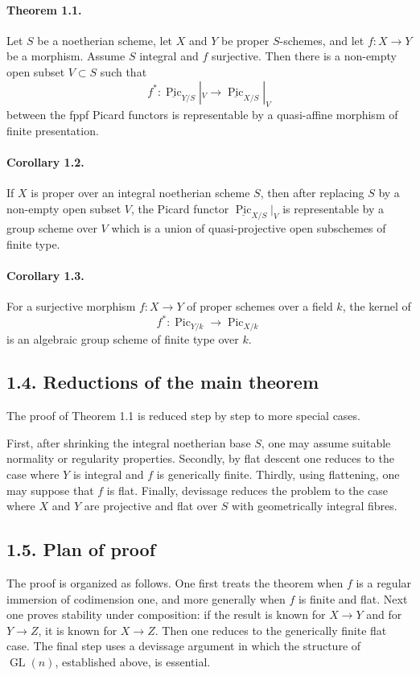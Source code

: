 \documentclass[12pt]{article}
\newcommand{\Pic}{\operatorname{Pic}}
\newcommand{\Gl}{\operatorname{GL}}
\newcommand{\longto}{\longrightarrow}
\begin{document}
\paragraph{Theorem 1.1.}
Let $S$ be a noetherian scheme, let $X$ and $Y$ be proper $S$-schemes, and let $f:X\to Y$ be a morphism. Assume $S$ integral and $f$ surjective. Then there is a non-empty open subset $V\subset S$ such that
\[
f^*:\underline{\Pic}_{Y/S}|_V\longto \underline{\Pic}_{X/S}|_V
\]
between the fppf Picard functors is representable by a quasi-affine morphism of finite presentation.

\paragraph{Corollary 1.2.}
If $X$ is proper over an integral noetherian scheme $S$, then after replacing $S$ by a non-empty open subset $V$, the Picard functor $\underline{\Pic}_{X/S}|_V$ is representable by a group scheme over $V$ which is a union of quasi-projective open subschemes of finite type.

\paragraph{Corollary 1.3.}
For a surjective morphism $f:X\to Y$ of proper schemes over a field $k$, the kernel of
\[
f^*:\Pic_{Y/k}\longto\Pic_{X/k}
\]
is an algebraic group scheme of finite type over $k$.

\subsection*{1.4. Reductions of the main theorem}

The proof of Theorem 1.1 is reduced step by step to more special cases.

First, after shrinking the integral noetherian base $S$, one may assume suitable normality or regularity properties. Secondly, by flat descent one reduces to the case where $Y$ is integral and $f$ is generically finite. Thirdly, using flattening, one may suppose that $f$ is flat. Finally, devissage reduces the problem to the case where $X$ and $Y$ are projective and flat over $S$ with geometrically integral fibres.

\subsection*{1.5. Plan of proof}

The proof is organized as follows. One first treats the theorem when $f$ is a regular immersion of codimension one, and more generally when $f$ is finite and flat. Next one proves stability under composition: if the result is known for $X\to Y$ and for $Y\to Z$, it is known for $X\to Z$. Then one reduces to the generically finite flat case. The final step uses a devissage argument in which the structure of $\Gl(n)$, established above, is essential.
\end{document}
